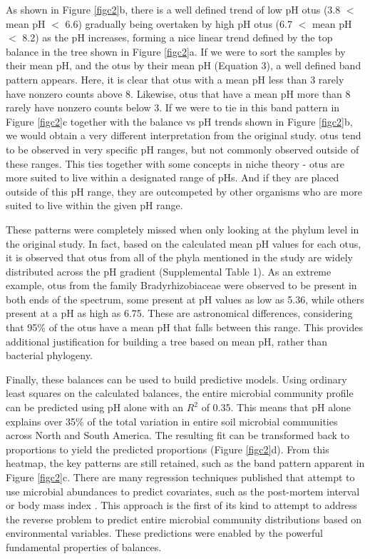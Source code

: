  As shown in Figure \ref{figc2}b, there is a well defined trend of low pH \gls{otu}s (3.8 $<$ mean pH $<$ 6.6) gradually being overtaken by high pH \gls{otu}s (6.7 $<$ mean pH $<$ 8.2) as the pH increases, forming a nice linear trend defined by the top balance in the tree shown in Figure \ref{figc2}a.  If we were to sort the samples by their mean pH, and the \gls{otu}s by their mean pH (Equation 3), a well defined band pattern appears.  Here, it is clear that \gls{otu}s with a mean pH less than 3 rarely have nonzero counts above 8.  Likewise, \gls{otu}s that have a mean pH more than 8 rarely have nonzero counts below 3.  If we were to tie in this band pattern in Figure \ref{figc2}c together with the balance vs pH trends shown in Figure \ref{figc2}b, we would obtain a very different interpretation from the original study.  \gls{otu}s tend to be observed in very specific pH ranges, but not commonly observed outside of these ranges.  This ties together with some concepts in niche theory - \gls{otu}s are more suited to live within a designated range of pHs.  And if they are placed outside of this pH range, they are outcompeted by other organisms who are more suited to live within the given pH range.  \par
 These patterns were completely missed when only looking at the phylum level in the original study.  In fact, based on the calculated mean pH values for each \gls{otu}s, it is observed that \gls{otu}s from all of the phyla mentioned in the study are widely distributed across the pH gradient (Supplemental Table 1).  As an extreme example, \gls{otu}s from the family Bradyrhizobiaceae were observed to be present in both ends of the spectrum, some present at pH values as low as 5.36, while others present at a pH as high as 6.75.  These are astronomical differences, considering
 that 95\% of the \gls{otu}s have a mean pH that falls between this range. This provides additional justification for building a tree based on mean pH, rather than bacterial phylogeny.\par
  Finally, these balances can be used to build predictive models.  Using ordinary least squares on the calculated balances, the entire microbial community profile can be predicted using pH alone with an $R^2$ of 0.35. This means that pH alone explains over 35\% of the total variation in entire soil microbial communities across North and South America. The resulting fit can be transformed back to proportions to yield the predicted proportions (Figure \ref{figc2}d).  From this heatmap, the key patterns are still retained, such as the band pattern apparent in Figure \ref{figc2}c. There are many regression techniques published that attempt to use microbial abundances to predict covariates, such as the post-mortem interval \cite{mammalian_corpse} or body mass index \cite{microbial_regression}. This approach is the first of its kind to attempt to address the reverse problem to predict entire microbial community distributions based on environmental variables. These predictions were enabled by the powerful fundamental properties of balances.\par
